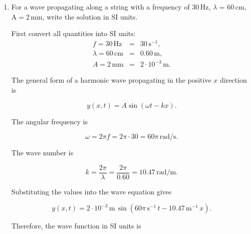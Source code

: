 \documentclass[t,aspectratio=169]{beamer}
\begin{document}
\begin{frame}
\begin{enumerate}
\pagebreak

\item For a wave propagating along a string with a frequency of 30\,Hz, $\lambda$ = 60\,cm, A$=$2\,mm, write the solution in SI units.

\bigskip
  
\begin{center}
\end{center}

First convert all quantities into SI units:
\begin{eqnarray*}
  f=30\,\mathrm{Hz}&=&30\,\mathrm{s^{-1}},\\
  \lambda=60\,\mathrm{cm}&=&0.60\,\mathrm{m},\\
  A=2\,\mathrm{mm}&=&2\cdot10^{-3}\,\mathrm{m}.
\end{eqnarray*}
  
The general form of a harmonic wave propagating in the positive $x$ direction is

$$y(x,t)=A\sin(\omega t-kx).$$

The angular frequency is

$$\omega=2\pi f=2\pi\cdot30=60\pi\,\mathrm{rad/s}.$$

\pagebreak
The wave number is

$$k=\frac{2\pi}{\lambda}=\frac{2\pi}{0.60}=10.47\,\mathrm{rad/m}.$$

Substituting the values into the wave equation gives

$$y(x,t)=2\cdot10^{-3}\,\mathrm{m}\,\sin(60\pi\,\mathrm{s^{-1}}\,t-10.47\,\mathrm{m^{-1}}\,x).$$

Therefore, the wave function in SI units is


\end{enumerate}
\end{frame}
\end{document}
